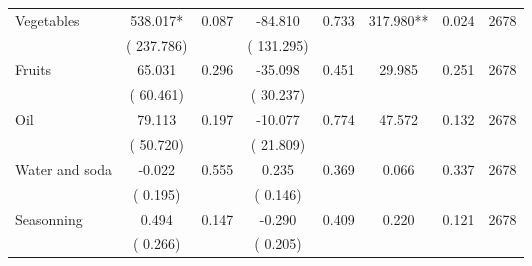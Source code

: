 \begin{tabular}{l*{7}{c}}
 Vegetables       &            538.017*       &        0.087  &            -84.810       &        0.733  &            317.980**       &              0.024 &  2678 \\ 
                       &       (     237.786)             &                               &       (     131.295)                     &                               &                                               &                                &                      \\ 

 Fruits       &             65.031       &        0.296  &            -35.098       &        0.451  &             29.985       &              0.251 &  2678 \\ 
                       &       (      60.461)             &                               &       (      30.237)                     &                               &                                               &                                &                      \\ 

 Oil       &             79.113       &        0.197  &            -10.077       &        0.774  &             47.572       &              0.132 &  2678 \\ 
                       &       (      50.720)             &                               &       (      21.809)                     &                               &                                               &                                &                      \\ 

 Water and soda       &             -0.022       &        0.555  &              0.235       &        0.369  &              0.066       &              0.337 &  2678 \\ 
                       &       (       0.195)             &                               &       (       0.146)                     &                               &                                               &                                &                      \\ 

 Seasonning       &              0.494       &        0.147  &             -0.290       &        0.409  &              0.220       &              0.121 &  2678 \\ 
                       &       (       0.266)             &                               &       (       0.205)                     &                               &                                               &                                &                      \\ 


\end{tabular}
